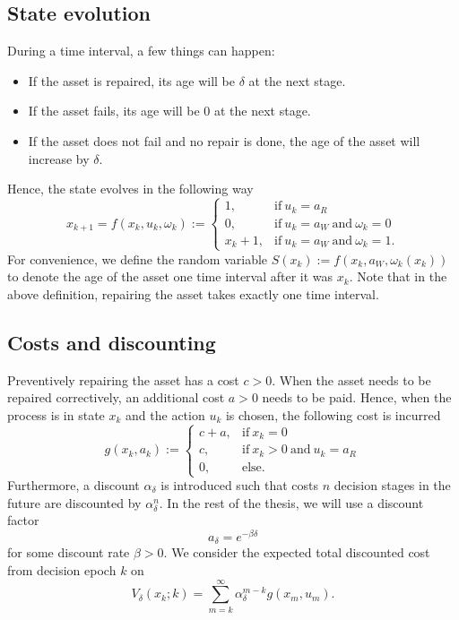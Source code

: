 \subsection{State evolution}
During a time interval, a few things can happen:
\begin{itemize}
	\item If the asset is repaired, its age will be $\delta$ at the next stage.
	\item If the asset fails, its age will be $0$ at the next stage.
	\item If the asset does not fail and no repair is done, the age of the asset will increase by $\delta$.
\end{itemize}
Hence, the state evolves in the following way
$$
x_{k+1}=f(x_k,u_k,\omega_k):=\begin{cases}
1,&\text{if}\ u_k=a_R \\
0,&\text{if}\ u_k=a_W\ \text{and}\ \omega_k=0 \\
x_k+1,&\text{if}\ u_k=a_W\ \text{and}\ \omega_k=1.
\end{cases}
$$
For convenience, we define the random variable $S(x_k):=f(x_k,a_W,\omega_k(x_k))$ to denote the age of the asset one time interval after it was $x_k$.
Note that in the above definition, repairing the asset takes exactly one time interval.

\subsection{Costs and discounting}
Preventively repairing the asset has a cost $c>0$.
When the asset needs to be repaired correctively, an additional cost $a>0$ needs to be paid.
Hence, when the process is in state $x_k$ and the action $u_k$ is chosen, the following cost is incurred
$$
g(x_k,a_k):=\begin{cases}
c+a,&\text{if}\ x_k=0 \\
c,&\text{if}\ x_k>0\ \text{and}\ u_k=a_R \\
0,&\text{else}.
\end{cases}
$$
Furthermore, a discount $\alpha_\delta$ is introduced such that costs $n$ decision stages in the future are discounted by $\alpha_\delta^n$.
In the rest of the thesis, we will use a discount factor
$$
a_\delta=e^{-\beta\delta}
$$
for some discount rate $\beta>0$.
We consider the expected total discounted cost from decision epoch $k$ on
$$
V_\delta(x_k;k)=\sum\limits_{m=k}^\infty \alpha_\delta^{m-k}g(x_m,u_m).
$$


